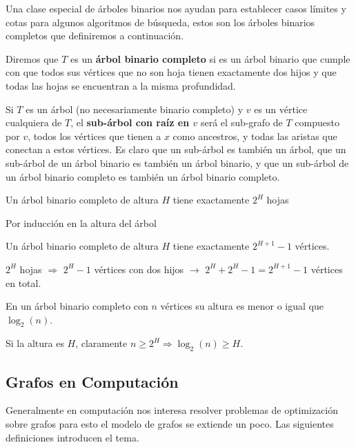 Una clase especial de árboles binarios nos ayudan para establecer casos límites y cotas para algunos algoritmos de búsqueda, estos son los árboles binarios completos que definiremos a continuación.

\begin{definicion}
  Diremos que $T$ es un {\bf árbol binario completo} si es un árbol binario que cumple con que todos sus vértices que no son hoja tienen exactamente dos hijos y que todas las hojas se encuentran a la misma profundidad.
  
  Si $T$ es un árbol (no necesariamente binario completo) y $v$ es un vértice cualquiera de $T$, el {\bf sub-árbol con raíz en $v$} será el sub-grafo de $T$ compuesto por $v$, todos los vértices que tienen a $x$ como ancestros, y todas las aristas que conectan a estos vértices.
  Es claro que un sub-árbol es también un árbol, que un sub-árbol de un árbol binario es también un árbol binario, y que un sub-árbol de un árbol binario completo es también un árbol binario completo.
\end{definicion}

\begin{teorema}
Un árbol binario completo de altura $H$ tiene exactamente $2^H$ hojas

\begin{demostracion} Por inducción en la altura del árbol
\end{demostracion}
\end{teorema}

\begin{corolario}
Un árbol binario completo de altura $H$ tiene exactamente $2^{H+1}-1$ vértices.

\begin{demostracion}
$2^H$ hojas $\Rightarrow$ $2^{H}-1$ vértices con dos hijos $\rightarrow$ $2^H+2^{H}-1=2^{H+1}-1$ vértices en total.
\end{demostracion}
\end{corolario}

\begin{corolario}
En un árbol binario completo con $n$ vértices su altura es menor o igual que $\log_2(n)$.

\begin{demostracion}
Si la altura es $H$, claramente $n\geq 2^H\Rightarrow \log_2(n)\geq H$.
\end{demostracion}
\end{corolario}

\subsection{Grafos en Computación}
Generalmente en computación nos interesa resolver problemas de optimización sobre grafos para esto el modelo de grafos se extiende un poco.
Las siguientes definiciones introducen el tema.

